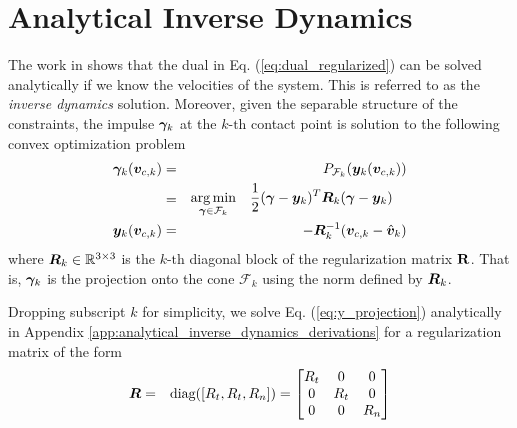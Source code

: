 \section{Analytical Inverse Dynamics}
\label{sec:analytical_inverse_dynamics}

The work in \cite{bib:todorov2014} shows that the dual in Eq.
(\ref{eq:dual_regularized}) can be solved analytically if we know the velocities
of the system. This is referred to as the \textit{inverse dynamics} solution.
Moreover, given the separable structure of the constraints, the impulse
${\bm\gamma}_k$ at the $k\text{-th}$ contact point is solution to the following
convex optimization problem
\begin{eqnarray}
	\bgamma_k(\vf{v}_{c,k})&=& P_{\mathcal{F}_k}(\vf{y}_k(\vf{v}_{c,k})) \nonumber\\
	&=&\begin{aligned}
		\argmin_{\bgamma\in\mathcal{F}_k} \quad &
	\frac{1}{2}(\bgamma-\vf{y}_k)^T\vf{R}_k(\bgamma-\vf{y}_k) \end{aligned}
    \label{eq:y_projection}\\
	\vf{y}_k(\vf{v}_{c,k}) &=& -\vf{R}_k^{-1}(\vf{v}_{c,k}-\hat{\vf{v}}_k)    
\end{eqnarray}
where ${\bm{R}}_k\in\mathbb{R}^{3\times3}$ is the $k\text{-th}$ diagonal block of
the regularization matrix ${\mathbf{R}}$. That is, ${\bm\gamma}_k$ is the projection onto
the cone $\mathcal{F}_k$ using the norm defined by ${\bm{R}}_k$.

Dropping subscript $k$ for simplicity, we solve Eq. (\ref{eq:y_projection})
analytically in Appendix \ref{app:analytical_inverse_dynamics_derivations} for a
regularization matrix of the form
\begin{eqnarray}	
	{\bm{R}} &=& \text{diag}([R_t, R_t, R_n]) = 
	\begin{bmatrix}
		R_t &   0 & 0\\
		  0 & R_t & 0\\
		  0 &   0 & R_n
	\end{bmatrix}
\end{eqnarray} 

